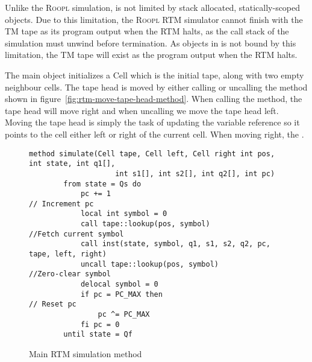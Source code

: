 Unlike the \textsc{Roopl} simulation, \rooplpp is not limited by stack allocated, statically-scoped objects. Due to this limitation, the \textsc{Roopl} RTM simulator cannot finish with the TM tape as its program output when the RTM halts, as the call stack of the simulation must unwind before termination. As objects in \rooplpp is not bound by this limitation, the TM tape will exist as the program output when the RTM halts.

The main object initializes a Cell which is the initial tape, along with two empty neighbour cells. The tape head is moved by either calling or uncalling the method shown in figure~\ref{fig:rtm-move-tape-head-method}. When calling the method, the tape head will move right and when uncalling we move the tape head left. Moving the tape head is simply the task of updating the variable reference so it points to the cell either left or right of the current cell. When moving right, the . 

\begin{figure}[ht]
    \centering
    \begin{lstlisting}[style = basic, language = roopl]
    method simulate(Cell tape, Cell left, Cell right int pos, int state, int q1[], 
                    int s1[], int s2[], int q2[], int pc)
        from state = Qs do 
            pc += 1                                         // Increment pc
            local int symbol = 0
            call tape::lookup(pos, symbol)                  //Fetch current symbol
            call inst(state, symbol, q1, s1, s2, q2, pc, tape, left, right)
            uncall tape::lookup(pos, symbol)                //Zero-clear symbol    
            delocal symbol = 0
            if pc = PC_MAX then                             // Reset pc
                pc ^= PC_MAX
            fi pc = 0
        until state = Qf
    \end{lstlisting}
    \caption{Main RTM simulation method}
    \label{fig:rtm-simulation-method}
\end{figure} 
